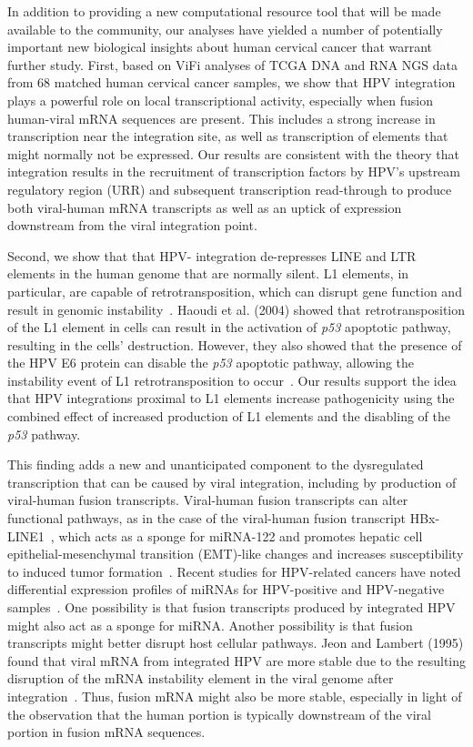 \documentclass{bmcart}
\begin{document}
In addition to providing a new computational resource tool that will be made available to the community, our analyses have yielded a number of potentially important new biological insights about human cervical cancer that warrant further study. First, based on ViFi analyses of TCGA DNA and RNA NGS data from 68 matched  human cervical cancer samples, we show that HPV integration plays a powerful role on local
transcriptional activity, especially when fusion human-viral mRNA
sequences are present.  This includes a strong increase in
transcription near the integration site, as well as transcription of
elements that might normally not be expressed.  Our results are
consistent with the theory that integration results in the recruitment
of transcription factors by HPV's upstream regulatory region (URR) and
subsequent transcription read-through to produce both viral-human mRNA
transcripts as well as an uptick of expression downstream from the
viral integration point.  

Second, we show that that HPV- integration de-represses LINE and LTR elements in the human genome that are normally silent. L1 elements, in particular, are capable of
retrotransposition, which can disrupt gene function and result in
genomic instability~\cite{Kazazian2002,Kemp2015}.  Haoudi et al. (2004) showed
that retrotransposition of the L1 element in cells can result in the
activation of \emph{p53} apoptotic pathway, resulting in the cells'
destruction.  However, they also showed that the presence of the HPV
E6 protein can disable the \emph{p53} apoptotic pathway, allowing the
instability event of L1 retrotransposition to
occur~\cite{Haoudi2004}. Our results support the idea that HPV
integrations proximal to L1 elements increase pathogenicity using the
combined effect of increased production of L1 elements and the
disabling of the \emph{p53} pathway.

This finding adds a new and unanticipated component to the dysregulated transcription that can be caused by viral integration, including by production of viral-human fusion transcripts. Viral-human fusion transcripts can alter functional
pathways, as in the case of the viral-human fusion transcript
HBx-LINE1~\cite{Lau2014,Liang2016}, which acts as a sponge for
miRNA-122 and promotes hepatic cell epithelial-mesenchymal transition
(EMT)-like changes and increases susceptibility to induced tumor
formation~\cite{Liang2016}.  Recent studies for HPV-related cancers
have noted differential expression profiles of miRNAs for HPV-positive
and HPV-negative samples~\cite{Lajer2012,Gao2016}.  One possibility is
that fusion transcripts produced by integrated HPV might also act as a
sponge for miRNA.  Another possibility is that fusion transcripts
might better disrupt host cellular pathways.  Jeon and Lambert (1995)
found that viral mRNA from integrated HPV are more stable due to the
resulting disruption of the mRNA instability element in the viral
genome after integration~\cite{Jeon1995}.  Thus, fusion mRNA might
also be more stable, especially in light of the observation that the
human portion is typically downstream of the viral portion in fusion
mRNA sequences.
\end{document}
